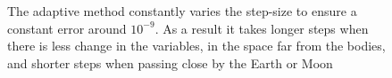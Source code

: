 \begin{figure}
{        }
        \caption{The adaptive method constantly varies the step-size to ensure a constant error around $10^{-9}$. As a result it takes longer steps when there is less change in the variables, in the space far from the bodies, and shorter steps when passing close by the Earth or Moon}
        \label{fig:adaptive-steP_error}
\end{figure}

\begin{figure}
    \centering
\end{figure}
